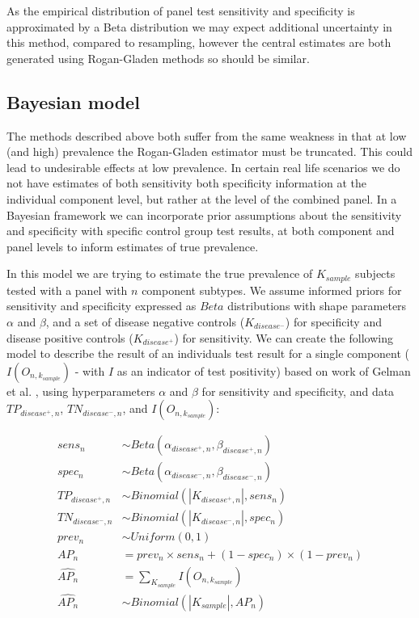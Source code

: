 \documentclass[a4paper, 12pt, twoside]{article}
\let\Oldsubsection\subsection
\renewcommand{\subsection}{\FloatBarrier\Oldsubsection}
\begin{document}
As the empirical distribution of panel test sensitivity and specificity is approximated by a Beta distribution we may expect additional uncertainty in this method, compared to resampling, however the central estimates are both generated using Rogan-Gladen methods so should be similar.

\subsection{Bayesian model}

The methods described above both suffer from the same weakness in that at low (and high) prevalence the Rogan-Gladen estimator must be truncated. This could lead to undesirable effects at low prevalence. In certain real life scenarios we do not have estimates of both sensitivity both specificity information at the individual component level, but rather at the level of the combined panel. In a Bayesian framework we can incorporate prior assumptions about the sensitivity and specificity with specific control group test results, at both component and panel levels to inform estimates of true prevalence.

In this model we are trying to estimate the true prevalence of \(K_{sample}\) subjects tested with a panel with \(n\) component subtypes. We assume informed priors for sensitivity and specificity expressed as \(Beta\) distributions with shape parameters \(\alpha\) and \(\beta\), and a set of disease negative controls (\(K_{disease^-}\)) for specificity and disease positive controls (\(K_{disease^+}\)) for sensitivity. We can create the following model to describe the result of an individuals test result for a single component (\(I(O_{n,k_{sample}})\) - with \(I\) as an indicator of test positivity) based on work of Gelman et al. \cite{gelman2020}, using hyperparameters \(\alpha\) and \(\beta\) for sensitivity and specificity, and data \(TP_{disease^+,n}\), \(TN_{disease^-,n}\), and \(I(O_{n,k_{sample}})\):

\begin{equation*}
\begin{aligned}
sens_n &\sim Beta(\alpha_{disease^+,n}, \beta_{disease^+,n}) \\
spec_n &\sim Beta(\alpha_{disease^-,n}, \beta_{disease^-,n}) \\
TP_{disease^+,n} &\sim Binomial(|K_{disease^+,n}|, sens_n) \\
TN_{disease^-,n} &\sim Binomial(|K_{disease^-,n}|, spec_n) \\
prev_n &\sim Uniform(0,1) \\
AP_n &= prev_n \times sens_n + (1-spec_n) \times (1-prev_n) \\
\widehat{AP_n} &= \sum_{K_{sample}}{I(O_{n,k_{sample}})} \\
\widehat{AP_n} &\sim Binomial(|K_{sample}|, AP_n) \\
\end{aligned}
\end{equation*}
\end{document}
